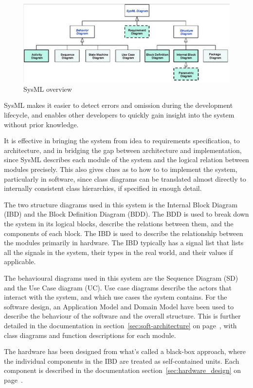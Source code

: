 \begin{figure}[H]
	\centering
	\includegraphics[max width=1\linewidth]{SysML.png}
	\caption{SysML overview\cite{SysML}}
	\label{fig:SysML}
\end{figure}

SysML makes it easier to detect errors and omission during the development lifecycle\cite{SysML_faq}, and enables other developers to quickly gain insight into the system without prior knowledge. 

It is effective in bringing the system from idea to requirements specification, to architecture, and in bridging the gap between architecture and implementation, since SysML describes each module of the system and the logical relation between modules precisely. This also gives clues as to how to to implement the system, particularly in software, since class diagrams can be translated almost directly to internally consistent class hierarchies, if specified in enough detail.

The two structure diagrams used in this system is the Internal Block Diagram (IBD) and the Block Definition Diagram (BDD). The BDD is used to break down the system in its logical blocks, describe the relations between them, and the components of each block. The IBD is used to describe the relationship between the modules primarily in hardware. The IBD typically has a signal list that lists all the signals in the system, their types in the real world, and their values if applicable.

The behavioural diagrams used in this system are the Sequence Diagram (SD) and the Use Case diagram (UC). Use case diagrams describe the actors that interact with the system, and which use cases the system contains. For the software design, an Application Model and Domain Model have been used to describe the behaviour of the software and the overall structure. This is further detailed in the documentation in section~\ref{sec:soft-architecture} on page~\pageref{sec:soft-architecture}, with class diagrams and function descriptions for each module.

The hardware has been designed from what's called a black-box approach, where the individual components in the IBD are treated as self-contained units. Each component is described in the documentation section~\ref{sec:hardware_design} on page~\pageref{sec:hardware_design}.


